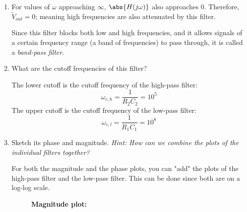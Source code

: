 \begin{enumerate}
{\begin{enumerate}[label=(\roman*)]
  \item For values of $\omega$ approaching $\infty$, $\abs{H(j \omega)}$ also approaches $0$.
    Therefore, $\widetilde{V}_{out} = 0$; meaning high frequencies are also attenuated by this filter. 

    \vspace{0.1 cm} 
    
    Since this filter blocks both low and high frequencies, and it allows signals of a certain frequency range (a band of frequencies) to pass through, it is called a \emph{band-pass filter}.
  \item What are the cutoff frequencies of this filter?

    The lower cutoff is the cutoff frequency of the high-pass filter:
    $$\omega_{c,h} = \frac{1}{R_{2}C_{2}} = 10^{5}$$
    The upper cutoff is the cutoff frequency of the low-pass filter:
    $$\omega_{c,l} = \frac{1}{R_{1}C_{1}} = 10^{8}$$
  \item Sketch its phase and magnitude. \textit{Hint: How can we combine the plots of the individual filters together?}

    For both the magnitude and the phase plots, you can "add" the plots of the high-pass filter and the low-pass filter.
    This can be done since both are on a log-log scale.
    \begin{figure}[h]
    \textbf{Magnitude plot:}
    \centering
    \end{figure}


\end{enumerate}}
\end{enumerate}
